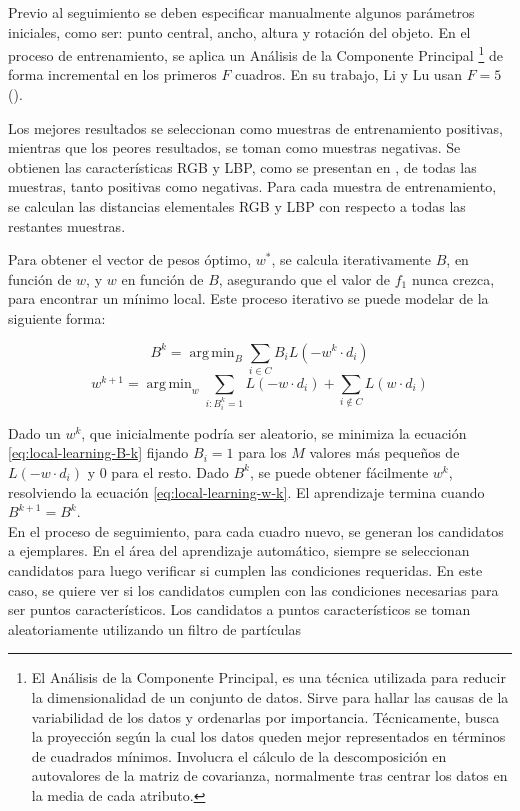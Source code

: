 \documentclass[a4paper,10pt]{article}
\DeclareMathOperator*{\argmin}{arg\,min}
\begin{document}
Previo al seguimiento se deben especificar manualmente algunos parámetros iniciales,
como ser: punto central, ancho, altura y rotación del objeto. En el proceso de
entrenamiento, se aplica un Análisis de la Componente Principal
\footnote{El Análisis de la Componente Principal, es una técnica utilizada para reducir la dimensionalidad de un conjunto de datos.
Sirve para hallar las causas de la variabilidad de los datos y ordenarlas por importancia.
Técnicamente, busca la proyección según la cual los datos queden mejor representados en términos de cuadrados mínimos. Involucra el cálculo de la descomposición en
autovalores de la matriz de covarianza, normalmente tras centrar los datos en la media de cada atributo.}
de forma incremental en los primeros $F$ cuadros. En su trabajo, Li y Lu usan
$F = 5$ (\cite{local-learning}).

Los mejores resultados se seleccionan como muestras de entrenamiento positivas, mientras que
los peores resultados, se toman como muestras negativas. Se obtienen las características
RGB y LBP, como se presentan en \cite{tracking-bag-of-features}, de todas las muestras,
tanto positivas como negativas. Para cada muestra de entrenamiento, se calculan las
distancias elementales RGB y LBP con respecto a todas las restantes muestras.

Para obtener el vector de pesos óptimo, $w^{*}$, se calcula iterativamente $B$,
en función de $w$, y $w$ en función de $B$, asegurando que el valor de $f_{1}$ nunca
crezca, para encontrar un mínimo local. Este proceso iterativo se puede modelar de la
siguiente forma:

\begin{equation}
   \label{eq:local-learning-B-k}
   B^{k} = \argmin_{B} \sum_{i \in C} B_{i}L(-w^{k} \cdot d_{i})
\end{equation}
\begin{equation}
    \label{eq:local-learning-w-k}
    w^{k+1} = \argmin_{w} \sum_{i:B_{i}^{k}=1} L(-w \cdot d_{i}) + \sum_{i\notin C}L(w \cdot d_{i})
\end{equation}

Dado un $w^{k}$, que inicialmente podría ser aleatorio, se minimiza la ecuación
\ref{eq:local-learning-B-k} fijando $B_{i} = 1$ para los $M$ valores más
pequeños de $L(-w \cdot d_{i})$ y $0$ para el resto. Dado $B^{k}$, se puede
obtener fácilmente $w^{k}$, resolviendo la ecuación \ref{eq:local-learning-w-k}.
El aprendizaje termina cuando $B^{k+1}=B^{k}$.\\

En el proceso de seguimiento, para cada cuadro nuevo, se generan los candidatos
a ejemplares. En el área del aprendizaje automático, siempre se seleccionan
candidatos para luego verificar si cumplen las condiciones requeridas. En este
caso, se quiere ver si los candidatos cumplen con las condiciones necesarias
para ser puntos característicos. Los candidatos a puntos característicos se
toman aleatoriamente utilizando un filtro de partículas
\end{document}
